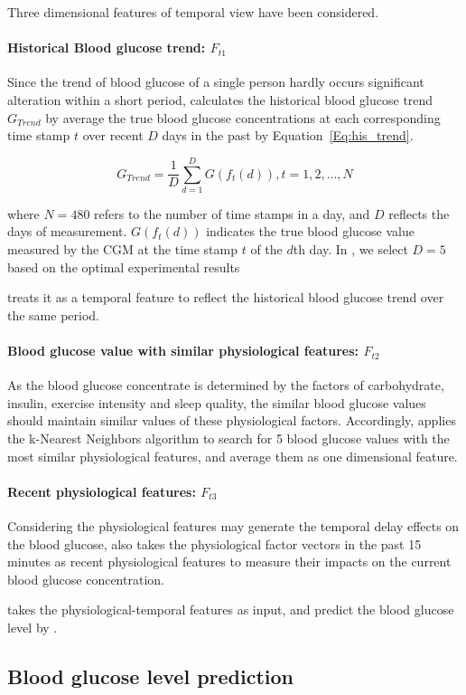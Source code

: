 Three dimensional features of temporal view have been considered.

\paragraph{Historical Blood glucose trend: $F_{t1}$}
Since the trend of blood glucose of a single person hardly occurs significant alteration
within a short period, \sysname calculates the historical blood glucose trend $G_{Trend}$ by average the true blood glucose
concentrations at each corresponding time stamp $t$ over recent $D$ days in the past by Equation~\ref{Eq:his_trend}.

\begin{equation}\label{Eq:his_trend}
  G_{Trend}=\frac{1}{D}\sum_{d=1}^{D}G(f_t(d)),  t=1,2,...,N
\end{equation}

where $N=480$ refers to the number of time stamps in a day, and $D$ reflects the days of measurement. $G(f_t(d))$ indicates the true blood glucose value measured by the CGM
at the time stamp $t$ of the $d$th day. In \sysname, we select $D=5$ based on the optimal experimental results

\sysname treats it as a temporal feature to reflect the historical blood glucose trend
over the same period.

\paragraph{Blood glucose value with similar physiological features: $F_{t2}$}
As the blood glucose concentrate is determined by the factors of carbohydrate, insulin, exercise intensity and sleep quality, the similar blood
glucose values should maintain similar values of these physiological factors. Accordingly, \sysname applies the k-Nearest Neighbors algorithm \cite{bib:KNN}
to search for 5 blood glucose values with the most similar physiological features, and average them as one dimensional feature.

\paragraph{Recent physiological features: $F_{t3}$}
Considering the physiological features may generate the temporal delay effects on the blood glucose, \sysname also takes the physiological factor vectors
in the past 15 minutes as recent physiological features to measure their impacts on the current blood glucose concentration.

\sysname takes the physiological-temporal features as input, and predict the blood glucose level by \modelname.


\subsection{Blood glucose level prediction}



